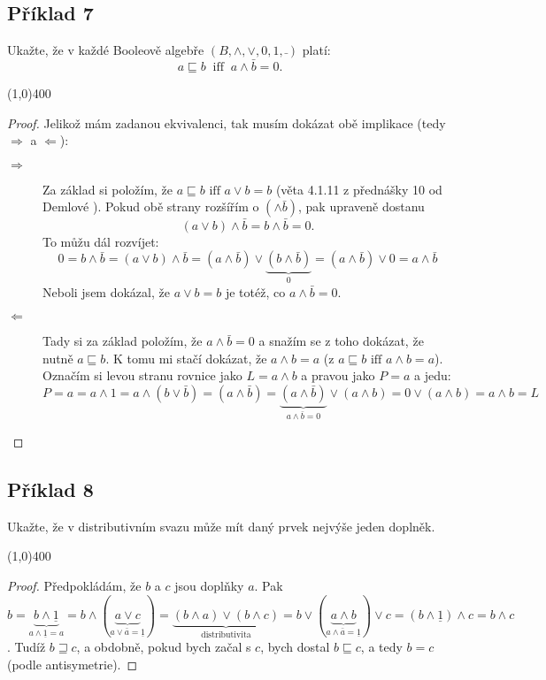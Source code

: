\documentclass{article}
\begin{document}
\subsection{Příklad 7}
Ukažte, že v každé Booleově algebře $(B,\wedge,\vee,0,1,\bar{\ })$ platí:
\[ a \sqsubseteq b \ \mbox{ iff } \ a \wedge \bar{b} = 0. \]

\line(1,0){400}

\begin{proof}
Jelikož mám zadanou ekvivalenci, tak musím dokázat obě implikace (tedy $\Rightarrow$ a $\Leftarrow$):

\begin{description}
	\item[$\Rightarrow$] Za základ si položím, že $a \sqsubseteq b \mbox{ iff } a \vee b = b$ (věta 4.1.11 z přednášky 10 od Demlové \cite{demlova09}). Pokud obě strany rozšířím o $(\wedge \bar{b})$, pak upraveně dostanu
	\[ (a \vee b) \wedge \bar{b} = b \wedge \bar{b} = 0.\]
	To můžu dál rozvíjet:
	\[ 0 = b \wedge \bar{b} = (a \vee b) \wedge \bar{b} = (a \wedge \bar{b}) \vee \underbrace{(b \wedge \bar{b})}_{0} = (a \wedge \bar{b}) \vee 0 = a \wedge \bar{b} \]
	Neboli jsem dokázal, že  $a \vee b = b$ je totéž, co $a \wedge \bar{b} = 0$.
	\item[$\Leftarrow$] Tady si za základ položím, že $a \wedge \bar{b} = 0$ a snažím se z toho dokázat, že nutně $a \sqsubseteq b$. K tomu mi stačí dokázat, že $a \wedge b = a$ (z $a \sqsubseteq b \mbox{ iff } a \wedge b = a$). Označím si levou stranu rovnice jako $L = a \wedge b$ a pravou jako $P = a$ a jedu:
	\[ P = a = a \wedge 1 = a \wedge (b \vee \bar{b}) = (a \wedge \bar{b}) = \underbrace{(a \wedge \bar{b})}_{a \wedge \bar{b} = 0} \vee (a \wedge b) = 0 \vee (a \wedge b) = a \wedge b = L \]
\end{description}
\end{proof}

\subsection{Příklad 8}
Ukažte, že v distributivním svazu může mít daný prvek nejvýše jeden doplněk.

\line(1,0){400}

\begin{proof}
Předpokládám, že $b$ a $c$ jsou doplňky $a$. Pak $b = \underbrace{b\wedge\underline{1}}_{a \wedge \underline{1} = a} = b\wedge(\underbrace{a \vee c}_{a \vee \bar{a} = \underline{1}}) = \underbrace{(b\wedge a)\vee(b\wedge c)}_{\mbox{distributivita}} = b \vee (\underbrace{a \wedge b}_{a \wedge \bar{a} = \underline{1}}) \vee c = (b \wedge \underline{1}) \wedge c = b \wedge c$. Tudíž $b \sqsupseteq c$, a obdobně, pokud bych začal s $c$, bych dostal $b \sqsubseteq c$, a tedy $b = c$ (podle antisymetrie).  
\end{proof}
\end{document}
